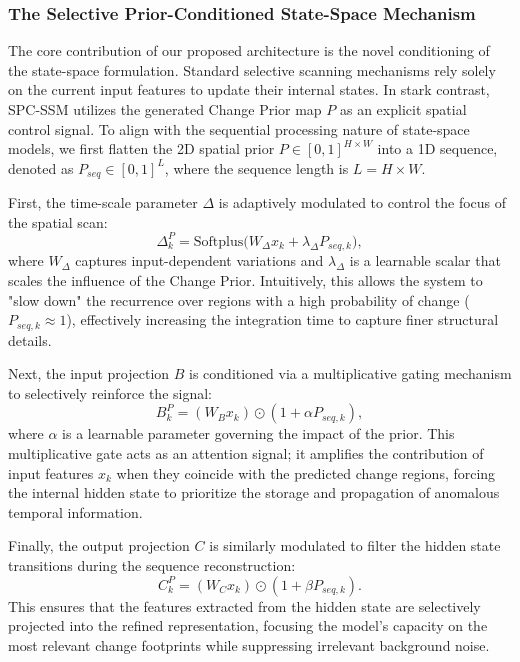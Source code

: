 \documentclass[10pt,conference]{IEEEtran}
\begin{document}
\subsubsection{The Selective Prior-Conditioned State-Space Mechanism}
The core contribution of our proposed architecture is the novel conditioning of the state-space formulation. Standard selective scanning mechanisms rely solely on the current input features to update their internal states. In stark contrast, SPC-SSM utilizes the generated Change Prior map $P$ as an explicit spatial control signal. To align with the sequential processing nature of state-space models, we first flatten the 2D spatial prior $P \in [0, 1]^{H \times W}$ into a 1D sequence, denoted as $P_{seq} \in [0, 1]^L$, where the sequence length is $L = H \times W$. 

First, the time-scale parameter $\Delta$ is adaptively modulated to control the focus of the spatial scan:
\begin{equation}
    \Delta_k^P = \text{Softplus}\big( W_{\Delta} x_k + \lambda_{\Delta} P_{seq, k} \big),
\end{equation}
where $W_{\Delta}$ captures input-dependent variations and $\lambda_{\Delta}$ is a learnable scalar that scales the influence of the Change Prior. Intuitively, this allows the system to "slow down" the recurrence over regions with a high probability of change ($P_{seq, k} \approx 1$), effectively increasing the integration time to capture finer structural details.

Next, the input projection $B$ is conditioned via a multiplicative gating mechanism to selectively reinforce the signal:
\begin{equation}
    B_k^P = (W_{B} x_k) \odot (1 + \alpha P_{seq, k}),
\end{equation}
where $\alpha$ is a learnable parameter governing the impact of the prior. This multiplicative gate acts as an attention signal; it amplifies the contribution of input features $x_k$ when they coincide with the predicted change regions, forcing the internal hidden state to prioritize the storage and propagation of anomalous temporal information.

Finally, the output projection $C$ is similarly modulated to filter the hidden state transitions during the sequence reconstruction:
\begin{equation}
    C_k^P = (W_{C} x_k) \odot (1 + \beta P_{seq, k}).
\end{equation}
This ensures that the features extracted from the hidden state are selectively projected into the refined representation, focusing the model's capacity on the most relevant change footprints while suppressing irrelevant background noise.
\end{document}
